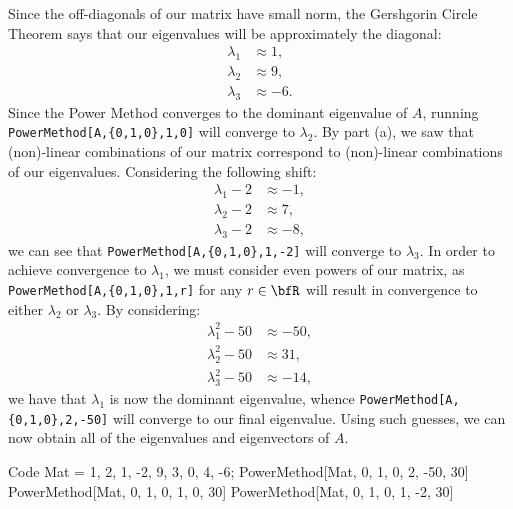 \documentclass[12pt,twoside,openany]{memoir}
\begin{document}
\begin{solution}
        Since the off-diagonals of our matrix have small norm, the Gershgorin Circle Theorem says that our eigenvalues will be approximately the diagonal:
            \begin{equation*}
            \begin{split}
                \lambda_1 &\approx 1, \\
                \lambda_2 &\approx 9, \\
                \lambda_3 &\approx -6.
            \end{split}
            \end{equation*}
        Since the Power Method converges to the dominant eigenvalue of $A$, running \newline \texttt{PowerMethod[A,\{0,1,0\},1,0]} will converge to $\lambda_2$. By part (a), we saw that (non)-linear combinations of our matrix correspond to (non)-linear combinations of our eigenvalues. Considering the following shift:
            \begin{equation*}
            \begin{split}
                \lambda_1-2 &\approx -1, \\
                \lambda_2-2 &\approx 7, \\
                \lambda_3-2 &\approx -8,
            \end{split}
            \end{equation*}
        we can see that \texttt{PowerMethod[A,\{0,1,0\},1,-2]} will converge to $\lambda_3$. In order to achieve convergence to $\lambda_1$, we must consider even powers of our matrix, as \texttt{PowerMethod[A,\{0,1,0\},1,r]} for any $r \in \bfR$ will result in convergence to either $\lambda_2$ or $\lambda_3$. By considering:
            \begin{equation*}
            \begin{split}
                \lambda_1^2-50 &\approx -50, \\
                \lambda_2^2-50 &\approx 31, \\
                \lambda_3^2-50 &\approx -14,
            \end{split}
            \end{equation*}
        we have that $\lambda_1$ is now the dominant eigenvalue, whence \texttt{PowerMethod[A,\{0,1,0\},2,-50]} will converge to our final eigenvalue. Using such guesses, we can now obtain all of the eigenvalues and eigenvectors of $A$.
\begin{mmaCell}[functionlocal = y]{Code}
Mat = {{1, 2, 1}, {-2, 9, 3}, {0, 4, -6}};
PowerMethod[Mat, {0, 1, 0}, 2, -50, 30]
PowerMethod[Mat, {0, 1, 0}, 1, 0, 30]
PowerMethod[Mat, {0, 1, 0}, 1, -2, 30]
\end{mmaCell}


\end{solution}
\end{document}
